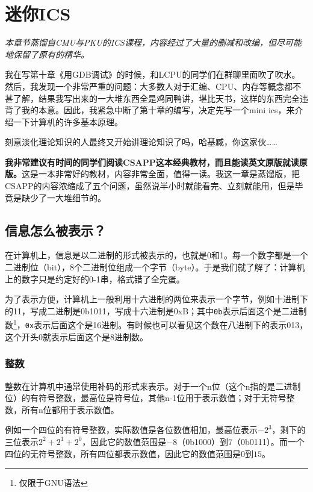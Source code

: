 \documentclass[../main.tex]{subfiles}
\begin{document}
\chapter{迷你ICS}

\begin{flushright}
  \emph{本章节蒸馏自CMU与PKU的ICS课程，内容经过了大量的删减和改编，但尽可能地保留了原有的精华。}
\end{flushright}

我在写第十章《用GDB调试》的时候，和LCPU的同学们在群聊里面吹了吹水。然后，我发现一个非常严重的问题：大多数人对于汇编、CPU、内存等概念都不甚了解，结果我写出来的一大堆东西全是鸡同鸭讲，堪比天书，这样的东西完全违背了我的本意。因此，我紧急中断了第十章的编写，决定先写一个mini ics，来介绍一下计算机的许多基本原理。

刻意淡化理论知识的人最终又开始讲理论知识了吗，哈基臧，你这家伙……

\textbf{我非常建议有时间的同学们阅读CSAPP这本经典教材，而且能读英文原版就读原版。}这是一本非常好的教材，内容非常全面，值得一读。我这一章是蒸馏版，把CSAPP的内容浓缩成了五个问题，虽然说半小时就能看完、立刻就能用，但是毕竟是缺少了一大堆细节的。

\section{信息怎么被表示？}

在计算机上，信息是以二进制的形式被表示的，也就是0和1。每一个数字都是一个二进制位（bit），8个二进制位组成一个字节（byte）。于是我们就了解了：计算机上的数字只是约定好的0-1串，格式错了全完蛋。

为了表示方便，计算机上一般利用十六进制的两位来表示一个字节，例如十进制下的11，写成二进制是0b1011，写成十六进制是0xB；其中\texttt{0b}表示后面这个是二进制数\footnote{仅限于GNU语法}，\texttt{0x}表示后面这个是16进制。有时候也可以看见这个数在八进制下的表示013，这个开头0就表示后面这个是8进制数。

\subsection{整数}
整数在计算机中通常使用补码的形式来表示。对于一个n位（这个n指的是二进制位）的有符号整数，最高位是符号位，其他n-1位用于表示数值；对于无符号整数，所有n位都用于表示数值。

例如一个四位的有符号整数，实际数值是各位数值相加，最高位表示$-2^3$，剩下的三位表示$2^2 + 2^1 + 2^0$，因此它的数值范围是$-8$（0b1000）到$7$（0b0111）。而一个四位的无符号整数，所有四位都表示数值，因此它的数值范围是$0$到$15$。
\end{document}
